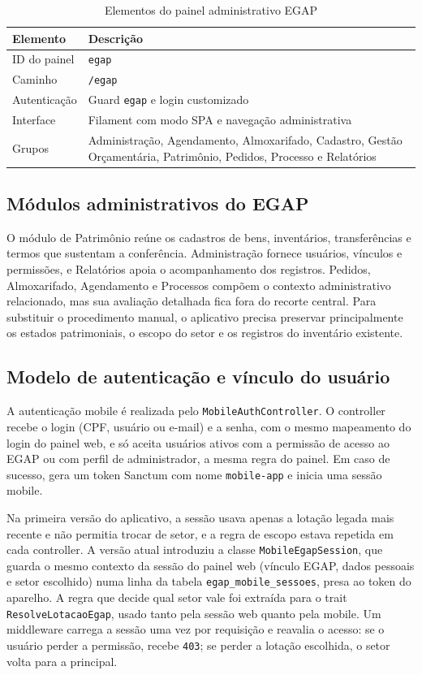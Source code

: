 \documentclass[12pt,a4paper]{article}
\begin{document}
\begin{table}[H]
\centering
\caption{Elementos do painel administrativo EGAP}
\begin{tabularx}{\textwidth}{L{4cm}Y}
\toprule
\textbf{Elemento} & \textbf{Descrição} \\
\midrule
ID do painel & \texttt{egap} \\
Caminho & \texttt{/egap} \\
Autenticação & Guard \texttt{egap} e login customizado \\
Interface & Filament com modo SPA e navegação administrativa \\
Grupos & Administração, Agendamento, Almoxarifado, Cadastro, Gestão Orçamentária, Patrimônio, Pedidos, Processo e Relatórios \\
\bottomrule
\end{tabularx}
\end{table}

\subsection{Módulos administrativos do EGAP}

O módulo de Patrimônio reúne os cadastros de bens, inventários, transferências e termos que sustentam a conferência. Administração fornece usuários, vínculos e permissões, e Relatórios apoia o acompanhamento dos registros. Pedidos, Almoxarifado, Agendamento e Processos compõem o contexto administrativo relacionado, mas sua avaliação detalhada fica fora do recorte central. Para substituir o procedimento manual, o aplicativo precisa preservar principalmente os estados patrimoniais, o escopo do setor e os registros do inventário existente.

\subsection{Modelo de autenticação e vínculo do usuário}

A autenticação mobile é realizada pelo \texttt{MobileAuthController}. O controller recebe o login (CPF, usuário ou e-mail) e a senha, com o mesmo mapeamento do login do painel web, e só aceita usuários ativos com a permissão de acesso ao EGAP ou com perfil de administrador, a mesma regra do painel. Em caso de sucesso, gera um token Sanctum com nome \texttt{mobile-app} e inicia uma sessão mobile.

Na primeira versão do aplicativo, a sessão usava apenas a lotação legada mais recente e não permitia trocar de setor, e a regra de escopo estava repetida em cada controller. A versão atual introduziu a classe \texttt{MobileEgapSession}, que guarda o mesmo contexto da sessão do painel web (vínculo EGAP, dados pessoais e setor escolhido) numa linha da tabela \texttt{egap\_mobile\_sessoes}, presa ao token do aparelho. A regra que decide qual setor vale foi extraída para o trait \texttt{ResolveLotacaoEgap}, usado tanto pela sessão web quanto pela mobile. Um middleware carrega a sessão uma vez por requisição e reavalia o acesso: se o usuário perder a permissão, recebe \texttt{403}; se perder a lotação escolhida, o setor volta para a principal.
\end{document}
